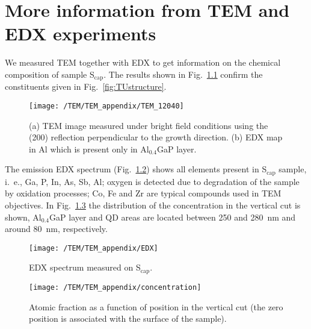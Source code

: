 \chapter{More information from TEM and EDX experiments}
\label{chapter:appendix_TEM}
We measured TEM together with EDX to get information on the chemical composition of sample S$_\mathrm{cap}$. The results shown in Fig.~\ref{fig:TEM_app} confirm the constituents given in Fig.~\ref{fig:TUstructure}.


\begin{figure}
	\centering
	\texttt{[image: /TEM/TEM\_appendix/TEM\_12040]}
	\caption{(a) TEM image measured under bright field conditions using the (200) reflection perpendicular to the growth direction. (b) EDX map in Al which is present only in Al$_{0.4}$GaP layer.}
	\label{fig:TEM_app}
\end{figure}

The emission EDX spectrum (Fig.~\ref{fig:EDX}) shows all elements present in S$_\mathrm{cap}$ sample, i.~e., Ga, P, In, As, Sb, Al; oxygen is detected due to degradation of the sample by oxidation processes; Co, Fe and Zr are typical compounds used in TEM objectives. In Fig.~\ref{fig:concentration_appendix} the distribution of the concentration in the vertical cut is shown, Al$_{0.4}$GaP layer and QD areas are located between 250 and 280~nm and around 80~nm, respectively.
\begin{figure}
	\centering
	\texttt{[image: /TEM/TEM\_appendix/EDX]}
	\caption{EDX spectrum measured on S$_\mathrm{cap}$.}
	\label{fig:EDX}
\end{figure}


\begin{figure}
	\centering
	\texttt{[image: /TEM/TEM\_appendix/concentration]}
	\caption{Atomic fraction as a function of position in the vertical cut (the zero position is associated with the surface of the sample).}
	\label{fig:concentration_appendix}
\end{figure}

\newpage 